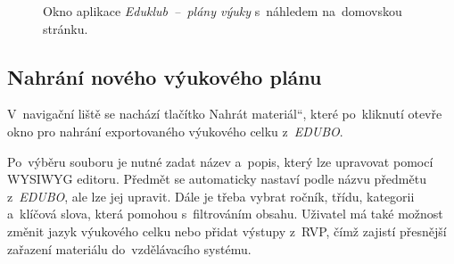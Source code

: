 \documentclass[male,czech,api_bc]{kitheses}
\begin{document}
\begin{figure}[H]
	\centering
	\caption{Okno aplikace \textit{Eduklub~--~plány výuky} s~náhledem na~domovskou stránku.}
	\label{fig:eduklub-1}
\end{figure}

\subsection{Nahrání nového výukového plánu}

V~navigační liště se nachází tlačítko \quotedblbase Nahrát materiál``, které po~kliknutí otevře okno pro nahrání exportovaného výukového celku z~\textit{EDUBO}.

Po~výběru souboru je nutné zadat název a~popis, který lze upravovat pomocí WYSIWYG editoru. Předmět se automaticky nastaví podle názvu předmětu z~\textit{EDUBO}, ale lze jej upravit. Dále je třeba vybrat ročník, třídu, kategorii a~klíčová slova, která pomohou s~filtrováním obsahu. Uživatel má také možnost změnit jazyk výukového celku nebo přidat výstupy z~RVP, čímž zajistí přesnější zařazení materiálu do~vzdělávacího systému.
\end{document}
